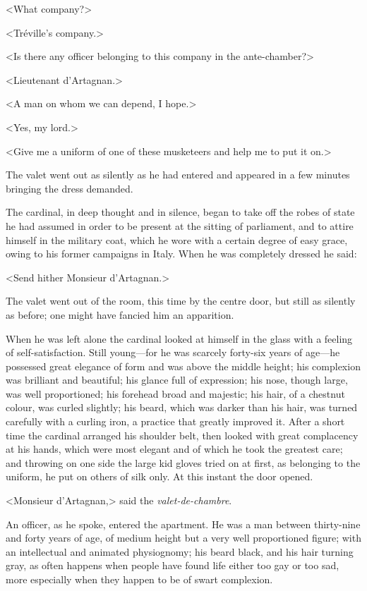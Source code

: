 <What company?>

<Tréville's company.>

<Is there any officer belonging to this company in the ante-chamber?>

<Lieutenant d'Artagnan.>

<A man on whom we can depend, I hope.>

<Yes, my lord.>

<Give me a uniform of one of these musketeers and help me to put it on.>

The valet went out as silently as he had entered and appeared in a few minutes bringing the dress demanded.

The cardinal, in deep thought and in silence, began to take off the robes of state he had assumed in order to be present at the sitting of parliament, and to attire himself in the military coat, which he wore with a certain degree of easy grace, owing to his former campaigns in Italy. When he was completely dressed he said:

<Send hither Monsieur d'Artagnan.>

The valet went out of the room, this time by the centre door, but still as silently as before; one might have fancied him an apparition.

When he was left alone the cardinal looked at himself in the glass with a feeling of self-satisfaction. Still young—for he was scarcely forty-six years of age—he possessed great elegance of form and was above the middle height; his complexion was brilliant and beautiful; his glance full of expression; his nose, though large, was well proportioned; his forehead broad and majestic; his hair, of a chestnut colour, was curled slightly; his beard, which was darker than his hair, was turned carefully with a curling iron, a practice that greatly improved it. After a short time the cardinal arranged his shoulder belt, then looked with great complacency at his hands, which were most elegant and of which he took the greatest care; and throwing on one side the large kid gloves tried on at first, as belonging to the uniform, he put on others of silk only. At this instant the door opened.

<Monsieur d'Artagnan,> said the \textit{valet-de-chambre}.

An officer, as he spoke, entered the apartment. He was a man between thirty-nine and forty years of age, of medium height but a very well proportioned figure; with an intellectual and animated physiognomy; his beard black, and his hair turning gray, as often happens when people have found life either too gay or too sad, more especially when they happen to be of swart complexion.

